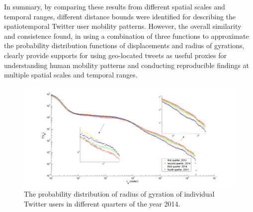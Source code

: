 \documentclass[ijgi,article,accept,moreauthors,pdftex,10pt,a4paper]{mdpi}
\theoremstyle{mdpi}
\newcounter{re}
\theoremstyle{mdpidefinition}
\begin{document}
In summary, by comparing these results from different spatial scales and temporal ranges, different distance bounds were identified for describing the spatiotemporal Twitter user mobility patterns.
However, the overall similarity and consistence found, in using a combination of three functions to approximate the probability distribution functions of displacements and radius of gyrations, clearly provide supports for using geo-located tweets as useful proxies for understanding human mobility patterns and conducting reproducible findings at multiple spatial scales and temporal ranges.

\begin{figure}[ht]
\centering
\includegraphics[width=1.0\linewidth]{./figures/gyration_season}
\caption{The probability distribution of radius of gyration of individual Twitter users in different quarters of the year 2014.}
\label{fig:gyration_season}
\end{figure}
\FloatBarrier
\end{document}
